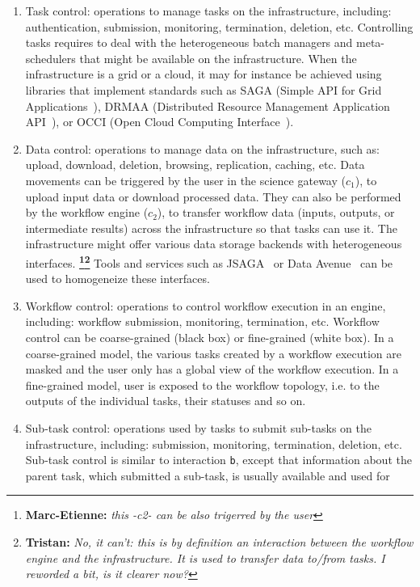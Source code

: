 \documentclass[preprint,3p,twocolumn]{elsarticle}
\newcommand{\note}[2]{\textbf{\Large{\color{blue}\footnote{{\color{blue}\textbf{#1:} \textit{#2}\color{black}}}}}}
\begin{document}
\begin{enumerate}[leftmargin=0cm,itemindent=0.65cm,label=\texttt{(\alph*)}]
\item Task control: operations to manage tasks on the infrastructure,
  including: authentication, submission, monitoring, termination,
  deletion, etc. Controlling tasks requires to deal with the
  heterogeneous batch managers and meta-schedulers that might be
  available on the infrastructure. When the infrastructure is a grid
  or a cloud, it may for instance be achieved using libraries that
  implement standards such as SAGA (Simple API for Grid
  Applications~\cite{goodale2006saga}), DRMAA (Distributed Resource
  Management Application API~\cite{troger2012distributed}), or OCCI
  (Open Cloud Computing Interface~\cite{edmonds2012toward}).
\item Data control: operations to manage data on the infrastructure,
  such as: upload, download, deletion, browsing, replication, caching,
  etc. Data movements can be triggered by the user in the science
  gateway (\texttt{$c_1$}), to upload input data or download processed
  data. They can also be performed by the workflow engine
  (\texttt{$c_2$}), to transfer workflow data (inputs, outputs, or
  intermediate results) across the infrastructure so that tasks can
  use it. The infrastructure might offer various data storage backends
  with heterogeneous interfaces. \note{Marc-Etienne}{this -c2- can be also trigerred
    by the user}\note{Tristan}{No, it can't: this is by definition an interaction between the workflow engine and the infrastructure. It is used to transfer data to/from tasks. I reworded a bit, is it clearer now?} Tools and services such as
  JSAGA~\cite{reynaud2010uniform} or Data Avenue~\cite{hajnal2014data}
  can be used to homogeneize these interfaces.
\item Workflow control: operations to control workflow execution in an
  engine, including: workflow submission, monitoring, termination,
  etc. Workflow control can be coarse-grained (black box) or
  fine-grained (white box). In a coarse-grained model, the various
  tasks created by a workflow execution are masked and the user only
  has a global view of the workflow execution. In a fine-grained
  model, user is exposed to the workflow topology, i.e. to the outputs
  of the individual tasks, their statuses and so on.
\item Sub-task control: operations used by tasks to submit sub-tasks
  on the infrastructure, including: submission, monitoring,
  termination, deletion, etc. Sub-task control is similar to
  interaction \texttt{b}, except that information about the parent
  task, which submitted a sub-task, is usually available and used for

\end{enumerate}
\end{document}

